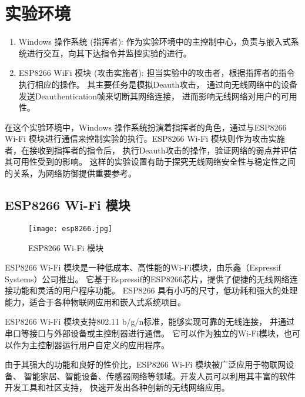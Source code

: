 \documentclass[../main.tex]{subfiles}
\begin{document}
\section{实验环境}
\begin{enumerate}
  \item Windows 操作系统 (指挥者): 作为实验环境中的主控制中心，负责与嵌入式系统进行交互，向其下达指令并监控实验的进行。
  \item ESP8266 WiFi 模块 (攻击实施者):
    担当实验中的攻击者，根据指挥者的指令执行相应的操作。
    其主要任务是模拟Deauth攻击，
    通过向无线网络中的设备发送Deauthentication帧来切断其网络连接，
    进而影响无线网络对用户的可用性。
\end{enumerate}

在这个实验环境中，Windows 操作系统扮演着指挥者的角色，通过与ESP8266 Wi-Fi
模块进行通信来控制实验的执行。ESP8266 Wi-Fi
模块则作为攻击实施者，在接收到指挥者的指令后，
执行Deauth攻击的操作，验证网络的弱点并评估其可用性受到的影响。
这样的实验设置有助于探究无线网络安全性与稳定性之间的关系，为网络防御提供重要参考。
%
\subsection{ESP8266 Wi-Fi 模块}
\begin{figure}[H]
  \begin{center}
    \texttt{[image: esp8266.jpg]}
  \end{center}
  \caption{ESP8266 Wi-Fi 模块}
\end{figure}

ESP8266 Wi-Fi 模块是一种低成本、高性能的Wi-Fi模块，由乐鑫（Espressif Systems）公司推出。
它基于Espressif的ESP8266芯片，提供了便捷的无线网络连接功能和灵活的用户程序功能。
ESP8266 具有小巧的尺寸，低功耗和强大的处理能力，适合于各种物联网应用和嵌入式系统项目。

ESP8266 Wi-Fi 模块支持802.11 b/g/n标准，能够实现可靠的无线连接，
并通过串口等接口与外部设备或主控制器进行通信。
它可以作为独立的Wi-Fi模块，也可以作为主控制器运行用户自定义的应用程序。

由于其强大的功能和良好的性价比，ESP8266 Wi-Fi 模块被广泛应用于物联网设备、
智能家居、智能设备、传感器网络等领域。开发人员可以利用其丰富的软件开发工具和社区支持，
快速开发出各种创新的无线网络应用。
\end{document}
